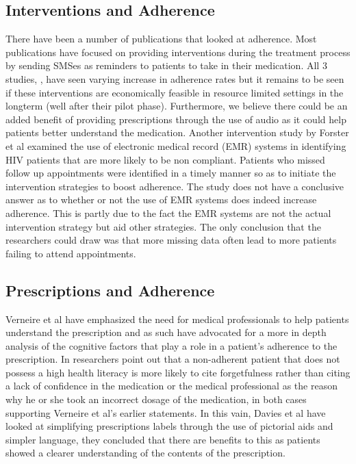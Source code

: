 \subsection{Interventions and Adherence}
There have been a number of publications that looked at adherence. Most publications have focused on providing interventions during the treatment process by sending SMSes as reminders to patients to take in their medication\cite{Strand10, Lester10, Pop11}. All 3 studies, \cite{Strand10, Lester10, Pop11}, have seen varying increase in adherence rates but it remains to be seen if these interventions are economically feasible in resource limited settings in the longterm (well after their pilot phase). Furthermore, we believe there could be an added benefit of providing prescriptions through the use of audio as it could help patients better understand the medication. Another intervention study by Forster et al \cite{Forster08} examined the use of electronic medical record (EMR) systems in identifying HIV patients that are more likely to be non compliant. Patients who missed follow up appointments were identified in a timely manner so as to initiate the intervention strategies to boost adherence. The study does not have a conclusive answer as to whether or not the use of EMR systems does indeed increase adherence. This is partly due to the fact the EMR systems are not the actual intervention strategy but aid other strategies. The only conclusion that the researchers could draw was that more missing data often lead to more patients failing to attend appointments.

\subsection{Prescriptions and Adherence}
Verneire et al \cite{Vern01} have emphasized the need for medical professionals to help patients understand the prescription and as such have advocated for a more in depth analysis of the cognitive factors that play a role in a patient's adherence to the prescription. In \cite{Ostini14} researchers point out that a non-adherent patient that does not possess a high health literacy is more likely to cite forgetfulness rather than citing a lack of confidence in the medication or the medical professional as the reason why he or she took an incorrect dosage of the medication, in both cases supporting Verneire et al's earlier statements. In this vain, Davies et al \cite{Davis06} have looked at simplifying prescriptions labels through the use of pictorial aids and simpler language, they concluded that there are benefits to this as patients showed a clearer understanding of the contents of the prescription.

